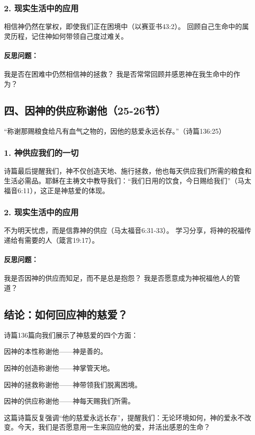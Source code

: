 \documentclass[a4paper, 12pt]{article}
\begin{document}
\subsubsection*{2. 现实生活中的应用}
相信神仍然在掌权，即使我们正在困境中（以赛亚书43:2）。
回顾自己生命中的属灵历程，记住神如何带领自己度过难关。
\paragraph*{反思问题：}

我是否在困难中仍然相信神的拯救？
我是否常常回顾并感恩神在我生命中的作为？
\subsection*{四、因神的供应称谢他（25-26节）}
“称谢那赐粮食给凡有血气之物的，因他的慈爱永远长存。”（诗篇136:25）

\subsubsection*{1. 神供应我们的一切}
诗篇最后提醒我们，神不仅创造天地、施行拯救，他也每天供应我们所需的粮食和生活必需品。耶稣在主祷文中教导我们：“我们日用的饮食，今日赐给我们”（马太福音6:11），这正是神慈爱的体现。

\subsubsection*{2. 现实生活中的应用}
不为明天忧虑，而是信靠神的供应（马太福音6:31-33）。
学习分享，将神的祝福传递给有需要的人（箴言19:17）。
\paragraph*{反思问题：}

我是否因神的供应而知足，而不是总是抱怨？
我是否愿意成为神祝福他人的管道？
\subsection*{结论：如何回应神的慈爱？}
诗篇136篇向我们展示了神慈爱的四个方面：

因神的本性称谢他——神是善的。

因神的创造称谢他——神掌管天地。

因神的拯救称谢他——神带领我们脱离困境。

因神的供应称谢他——神每天赐我们所需。

这篇诗篇反复强调“他的慈爱永远长存”，提醒我们：无论环境如何，神的爱永不改变。今天，我们是否愿意用一生来回应他的爱，并活出感恩的生命？
\end{document}
